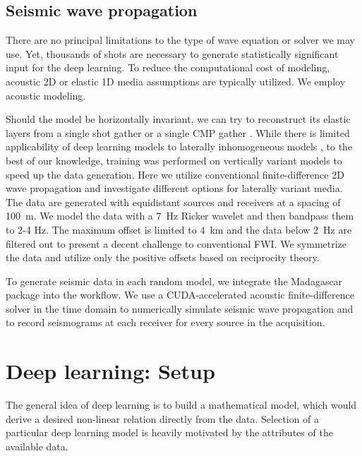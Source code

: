 \documentclass[paper,twocolomn]{geophysics}
\begin{document}
\subsection{Seismic wave propagation}
There are no principal limitations to the type of wave equation or solver we may use. Yet, thousands of shots are necessary to generate statistically significant input for the deep learning. To reduce the computational cost of modeling, acoustic 2D \citep{polo2018,ovcharenko2018,ovcharenko2019deep, li2019} or elastic 1D \citep[e.g.][]{zheng2019} media assumptions are typically utilized. We employ acoustic modeling.

Should the model be horizontally invariant, we can try to reconstruct its elastic layers from a single shot gather \citep{roth1994} or a single CMP gather \citep{zheng2019}.
While there is limited applicability of deep learning models to laterally inhomogeneous models \citep{zheng2019}, to the best of our knowledge, training was performed on vertically variant models to speed up the data generation. Here we utilize conventional finite-difference 2D wave propagation and investigate different options for laterally variant media.
The data are generated with equidistant sources and receivers at a spacing of 100~m. We model the data with a 7~Hz Ricker wavelet and then bandpass them to 2-4 Hz. The maximum offset is limited to 4~km and the data below 2~Hz are filtered out to present a decent challenge to conventional FWI. We symmetrize the data and utilize only the positive offsets  based on reciprocity theory.

To generate seismic data in each random model, we integrate the Madagascar package \citep{fomel2013madagascar} into the workflow. 
We use a CUDA-accelerated acoustic finite-difference solver in the time domain to numerically simulate seismic wave propagation and to record seismograms at each receiver for every source in the acquisition.
%

\section{Deep learning: Setup}
The general idea of deep learning is to build a mathematical model, which would derive a desired non-linear relation directly from the data. Selection of a particular deep learning model is heavily motivated by the attributes of the available data. 
\end{document}

